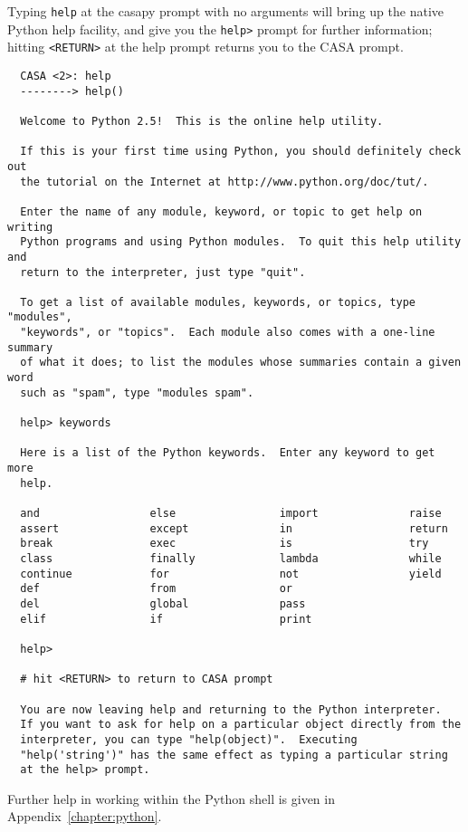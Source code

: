 Typing {\tt help} at the casapy prompt with no arguments will bring
up the native Python help facility, and give you the
{\tt help>} prompt for further information; hitting {\tt <RETURN>} at the help
prompt returns you to the CASA prompt.
\small
\begin{verbatim}
  CASA <2>: help
  --------> help()

  Welcome to Python 2.5!  This is the online help utility.

  If this is your first time using Python, you should definitely check out
  the tutorial on the Internet at http://www.python.org/doc/tut/.

  Enter the name of any module, keyword, or topic to get help on writing
  Python programs and using Python modules.  To quit this help utility and
  return to the interpreter, just type "quit".

  To get a list of available modules, keywords, or topics, type "modules",
  "keywords", or "topics".  Each module also comes with a one-line summary
  of what it does; to list the modules whose summaries contain a given word
  such as "spam", type "modules spam".

  help> keywords

  Here is a list of the Python keywords.  Enter any keyword to get more
  help.

  and                 else                import              raise
  assert              except              in                  return
  break               exec                is                  try
  class               finally             lambda              while
  continue            for                 not                 yield
  def                 from                or                  
  del                 global              pass                
  elif                if                  print               

  help>

  # hit <RETURN> to return to CASA prompt

  You are now leaving help and returning to the Python interpreter.
  If you want to ask for help on a particular object directly from the
  interpreter, you can type "help(object)".  Executing
  "help('string')" has the same effect as typing a particular string
  at the help> prompt.
\end{verbatim}
\normalsize

Further help in working within
the Python shell is given in Appendix~\ref{chapter:python}.

